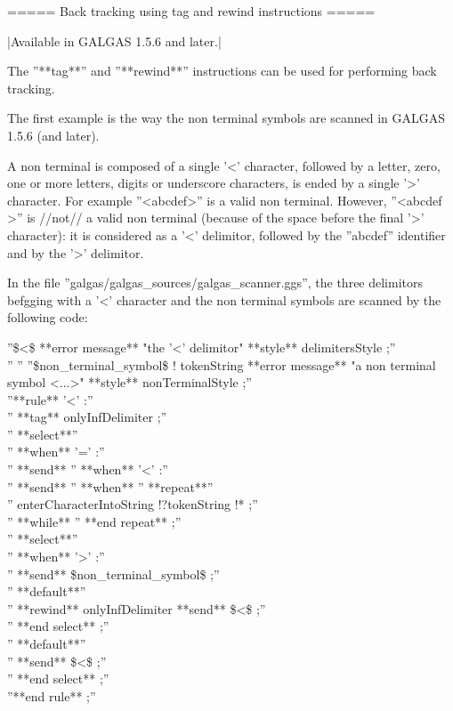 {===== Back tracking using tag and rewind instructions =====

|Available in GALGAS 1.5.6 and later.|

The ''**tag**'' and ''**rewind**'' instructions can be used for performing back tracking.

The first example is the way the non terminal symbols are scanned in GALGAS 1.5.6 (and later).

A non terminal is composed of a single '<' character, followed by a letter, zero, one or more letters, digits or underscore characters, is ended by a single '>' character. For example ''<abcdef>'' is a valid non terminal. However, ''<abcdef >'' is //not// a valid non terminal (because of the space before the final '>' character): it is considered as a '<' delimitor, followed by the ''abcdef'' identifier and by the '>' delimitor.

In the file ''galgas/galgas\_sources/galgas\_scanner.ggs'', the three delimitors befgging with a '<' character and the non terminal symbols are scanned by the following code:

''\$<\$ **error message** "the '<' delimitor" **style** delimitersStyle ;''\\
''%
''%
''\$non\_terminal\_symbol\$ ! tokenString **error message** "a non terminal symbol <...>" **style** nonTerminalStyle ;''\\

''**rule** '<' :''\\
'' **tag** onlyInfDelimiter ;''\\
'' **select**''\\
'' **when** '=' :''\\
'' **send** %
'' **when** '<' :''\\
''  **send** %
'' **when** %
''  **repeat**''\\
''   enterCharacterIntoString !?tokenString !* ;''\\
''  **while** %
''  **end repeat** ;''\\
''  **select**''\\
''  **when** '>' :''\\
''   **send** \$non\_terminal\_symbol\$ ;''\\
''  **default**''\\
''   **rewind** onlyInfDelimiter **send** \$<\$ ;''\\
''  **end select** ;''\\
'' **default**''\\
''  **send** \$<\$ ;''\\
'' **end select** ;''\\
''**end rule** ;''\\

}
